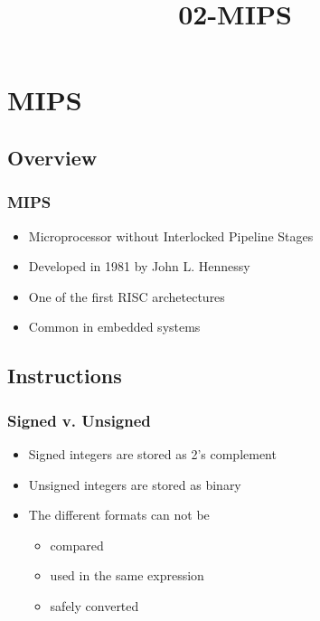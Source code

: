\documentclass[usepdftitle=false,professionalfonts,compress ]{beamer}
\title{02-MIPS}
\begin{document}
\frame[plain]{
	\frametitle{}
	\titlepage
	\vspace{-0.5cm}
	\begin{center}
	\end{center}
}
\frame{
	\tableofcontents[hideallsubsections]
}













\section{MIPS}
		
\subsection{Overview}

{
\begin{frame}\frametitle{MIPS}

	\begin{itemize}
	\item Microprocessor without Interlocked Pipeline Stages
			\item Developed in 1981 by John L. Hennessy
			\item One of the first RISC archetectures
			\item Common in embedded systems
				\end{itemize}

\end{frame}}






\subsection{Instructions}

{
\begin{frame}\frametitle{Signed v. Unsigned}

	\begin{itemize}
	\item Signed integers are stored as 2's complement
			\item Unsigned integers are stored as binary
			\item The different formats can not be

	\begin{itemize}
	\item compared
			\item used in the same expression
			\item safely converted
				\end{itemize}

				\end{itemize}

\end{frame}}
\end{document}
